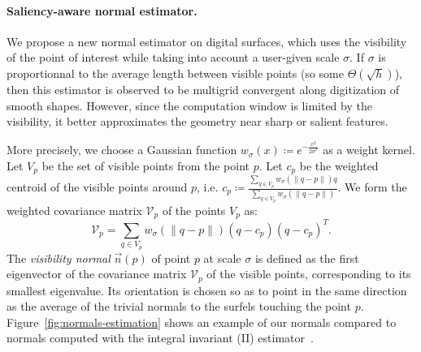 \documentclass[runningheads]{llncs}
\begin{document}
    \newcommand{\Kernel}[1]{\ensuremath{w_{\sigma}(#1)}}
    \paragraph{Saliency-aware normal estimator.}
    We propose a new normal estimator on digital surfaces, which uses
    the visibility of the point of interest while taking into account
    a user-given scale $\sigma$. If $\sigma$ is proportionnal to the
    average length between visible points (so some
    $\Theta(\sqrt{h})$), then this estimator is observed to be
    multigrid convergent along digitization of smooth shapes. However,
    since the computation window is limited by the visibility, it
    better approximates the geometry near sharp or salient features.

    More precisely, we choose a Gaussian function
    $\Kernel{x}\coloneqq e^{-\frac{x^2}{2\sigma^2}}$ as a weight kernel. Let
    $V_p$ be the set of visible points from the point $p$.  Let $c_p$
    be the weighted centroid of the visible points around $p$,
    i.e. $c_p \coloneqq \frac{\sum_{q \in V_p} \Kernel{\|q-p\|}q}{\sum_{q \in
        V_p} \Kernel{\|q-p\|}}$.  We form the weighted covariance matrix
    $\mathcal{V}_p$ of the points $V_p$ as:
    \begin{equation}
        \mathcal{V}_p = \sum_{q \in V_p} \Kernel{\|q-p\|}(q - c_p)(q - c_p)^T.
    \end{equation}
    The \emph{visibility normal} $\vec{n}(p)$ of point $p$ at scale $\sigma$ is defined
    as the first eigenvector of the covariance matrix $\mathcal{V}_p$
    of the visible points, corresponding to its smallest
    eigenvalue. Its orientation is chosen so as to point in the same
    direction as the average of the trivial normals to the surfels
    touching the point $p$. Figure~\ref{fig:normals-estimation} shows an example
    of our normals compared to normals computed with the integral invariant (II) estimator~\cite{Lachaud:2017-lnm}.
\end{document}
